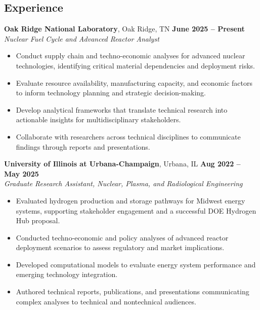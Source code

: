 \documentclass[margin,line]{resume}
\begin{document}
\begin{resume}
    \section{\mysidestyle Experience}
    \textbf{Oak Ridge National Laboratory}, Oak Ridge, TN \hfill \textbf{June 2025 -- Present} \\
    \textsl{Nuclear Fuel Cycle and Advanced Reactor Analyst} \\
    \begin{itemize}
        \item Conduct supply chain and techno-economic analyses for advanced nuclear technologies, identifying critical material dependencies and deployment risks.
        \item Evaluate resource availability, manufacturing capacity, and economic factors to inform technology planning and strategic decision-making.
        \item Develop analytical frameworks that translate technical research into actionable insights for multidisciplinary stakeholders.
        \item Collaborate with researchers across technical disciplines to communicate findings through reports and presentations.
    \end{itemize}

    \textbf{University of Illinois at Urbana-Champaign}, Urbana, IL \hfill \textbf{Aug 2022 -- May 2025} \\
    \textsl{Graduate Research Assistant, Nuclear, Plasma, and Radiological Engineering} \\
    \begin{itemize}
        \item Evaluated hydrogen production and storage pathways for Midwest energy systems, supporting stakeholder engagement and a successful DOE Hydrogen Hub proposal.
        \item Conducted techno-economic and policy analyses of advanced reactor deployment scenarios to assess regulatory and market implications.
        \item Developed computational models to evaluate energy system performance and emerging technology integration.
        \item Authored technical reports, publications, and presentations communicating complex analyses to technical and nontechnical audiences.
    \end{itemize}


\end{resume}
\end{document}
